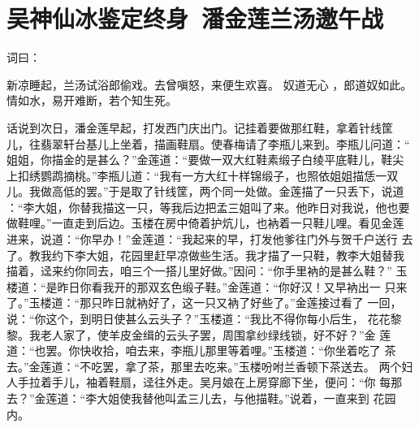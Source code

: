 \chapter{吴神仙冰鉴定终身~潘金莲兰汤邀午战}

词曰：

新凉睡起，兰汤试浴郎偷戏。去曾嗔怒，来便生欢喜。  奴道无心
，郎道奴如此。情如水，易开难断，若个知生死。

话说到次日，潘金莲早起，打发西门庆出门。记挂着要做那红鞋，拿着针线筐
儿，往翡翠轩台基儿上坐着，描画鞋扇。使春梅请了李瓶儿来到。李瓶儿问道：“
姐姐，你描金的是甚么？”金莲道：“要做一双大红鞋素缎子白绫平底鞋儿，鞋尖
上扣绣鹦鹉摘桃。”李瓶儿道：“我有一方大红十样锦缎子，也照依姐姐描恁一双
儿。我做高低的罢。”于是取了针线筐，两个同一处做。金莲描了一只丢下，说道
：“李大姐，你替我描这一只，等我后边把孟三姐叫了来。他昨日对我说，他也要
做鞋哩。”一直走到后边。玉楼在房中倚着护炕儿，也衲着一只鞋儿哩。看见金莲
进来，说道：“你早办！”金莲道：“我起来的早，打发他爹往门外与贺千户送行
去了。教我约下李大姐，花园里赶早凉做些生活。我才描了一只鞋，教李大姐替我
描着，迳来约你同去，咱三个一搭儿里好做。”因问：“你手里衲的是甚么鞋？”
玉楼道：“是昨日你看我开的那双玄色缎子鞋。”金莲道：“你好汉！又早衲出一
只来了。”玉楼道：“那只昨日就衲好了，这一只又衲了好些了。”金莲接过看了
一回，说：“你这个，到明日使甚么云头子？”玉楼道：“我比不得你每小后生，
花花黎黎。我老人家了，使羊皮金缉的云头子罢，周围拿纱绿线锁，好不好？”金
莲道：“也罢。你快收拾，咱去来，李瓶儿那里等着哩。”玉楼道：“你坐着吃了
茶去。”金莲道：“不吃罢，拿了茶，那里去吃来。”玉楼吩咐兰香顿下茶送去。
两个妇人手拉着手儿，袖着鞋扇，迳往外走。吴月娘在上房穿廊下坐，便问：“你
每那去？”金莲道：“李大姐使我替他叫孟三儿去，与他描鞋。”说着，一直来到
花园内。

